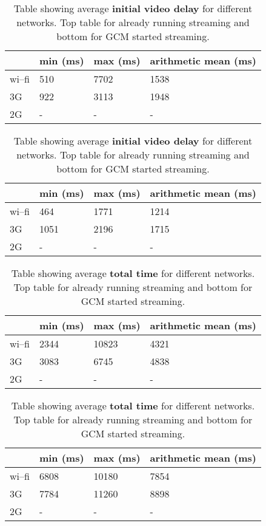 \vspace{-2em}
\begin{table}[H]
\caption{Table showing average \textbf{initial video delay} for different networks. Top table for already running streaming and bottom for GCM started streaming.}
\begin{center}
\begin{tabular}{|l|l|l|l|}
\hline 
& min (ms) & max (ms) & arithmetic mean (ms) \\
\hline 
wi--fi & 510 & 7702 & 1538 \\
\hline 
3G & 922 & 3113 & 1948 \\
\hline 
2G & - & - & - \\
\hline
\end{tabular} 

\label{table:delay}
\vspace{1em}
\begin{tabular}{|l|l|l|l|}
\hline 
& min (ms) & max (ms) & arithmetic mean (ms) \\
\hline 
wi--fi & 464 & 1771 & 1214 \\
\hline 
3G & 1051 & 2196 & 1715 \\
\hline 
2G & - & - & - \\
\hline
\end{tabular} 
\end{center}
\end{table}

\vspace{-2em}
\begin{table}[H]
\caption{Table showing average \textbf{total time} for different networks. Top table for already running streaming and bottom for GCM started streaming.}
\begin{center}
\begin{tabular}{|l|l|l|l|}
\hline 
& min (ms) & max (ms) & arithmetic mean (ms) \\
\hline 
wi--fi & 2344 & 10823 & 4321 \\
\hline 
3G & 3083 & 6745 & 4838 \\
\hline 
2G & - & - & - \\
\hline
\end{tabular} 

\label{table:total}
\vspace{1em}
\begin{tabular}{|l|l|l|l|}
\hline 
& min (ms) & max (ms) & arithmetic mean (ms) \\
\hline 
wi--fi & 6808 & 10180 & 7854 \\
\hline 
3G & 7784 & 11260 & 8898 \\
\hline 
2G & - & - & - \\
\hline
\end{tabular} 
\end{center}
\end{table}

